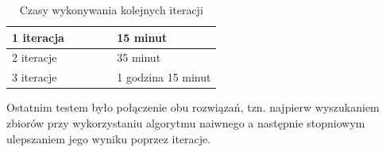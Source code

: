 \begin{table}[h!]
    \centering
    \begin{tabular}{|p{0.5\linewidth}|p{0.5\linewidth}|}
        \hline
		1 iteracja & 15 minut \\
		\hline
		2 iteracje & 35 minut \\
		\hline
		3 iteracje & 1 godzina 15 minut \\
		\hline
    \end{tabular}
    \caption{Czasy wykonywania kolejnych iteracji}
    \label{tab:iter_czasy}
\end{table}


Ostatnim testem było połączenie obu rozwiązań, tzn. najpierw wyszukaniem zbiorów
przy wykorzystaniu algorytmu naiwnego a następnie stopniowym ulepszaniem jego wyniku
poprzez iteracje.
